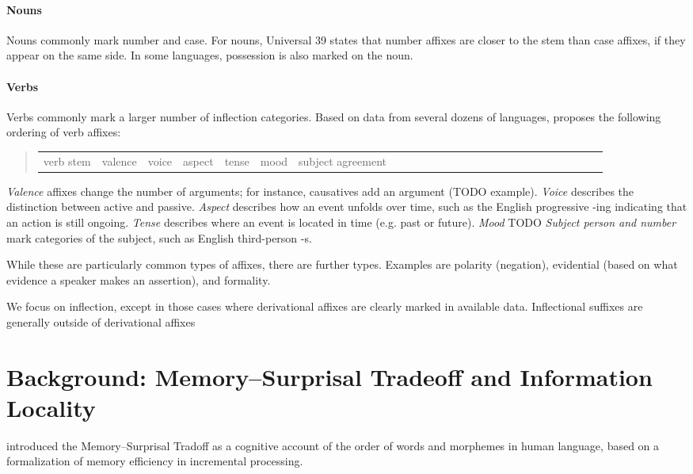 \documentclass[11pt,letterpaper]{article}
\begin{document}
\paragraph{Nouns}
Nouns commonly mark number and case.
For nouns, \citep[112]{greenberg1963universals} Universal 39 states that number affixes are closer to the stem than case affixes, if they appear on the same side.
In some languages, possession is also marked on the noun.

\paragraph{Verbs}
Verbs commonly mark a larger number of inflection categories.
Based on data from several dozens of languages, \citep{bybee-morphology-1985} proposes the following ordering of verb affixes:
\begin{quote}
\begin{tabular}{llllllllllllllllllllllllll}
verb stem & valence & voice & aspect & tense& mood & subject agreement
\end{tabular}
\end{quote}
\textit{Valence} affixes change the number of arguments; for instance, causatives add an argument (TODO example).
\textit{Voice} describes the distinction between active and passive.
\textit{Aspect} describes how an event unfolds over time, such as the English progressive -ing indicating that an action  is still ongoing.
\textit{Tense} describes where an event is located in time (e.g. past or future).
\textit{Mood} TODO
\textit{Subject person and number} mark categories of the subject, such as English third-person -s.

While these are particularly common types of affixes, there are further types.
Examples are polarity (negation), evidential (based on what evidence a speaker makes an assertion), and formality.


We focus on inflection, except in those cases where derivational affixes are clearly marked in available data.
Inflectional suffixes are generally outside of derivational affixes


\section{Background: Memory--Surprisal Tradeoff and Information Locality}

\citet{Hahn2020modeling} introduced the Memory--Surprisal Tradoff as a cognitive account of the order of words and morphemes in human language, based on a formalization of memory efficiency in incremental processing.
\end{document}
